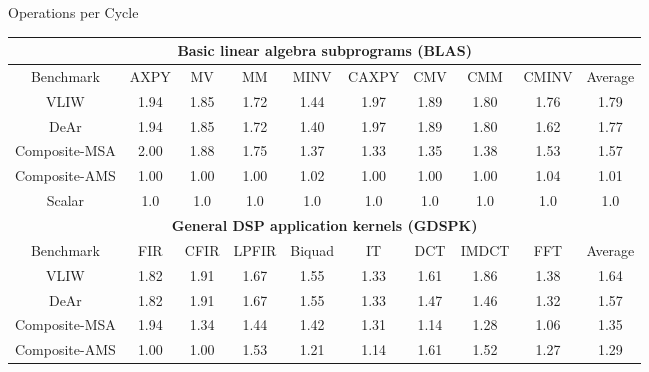 \documentclass{beamer}
\begin{document}
\begin{CJK}{UTF8}{bkai}
            \begin{frame}{Operations per Cycle}
                \begin{table}[!ht]
                    \centering
                    \resizebox{\columnwidth}{!}
                    {
                        \begin{tabular}{|c|c|c|c|c|c|c|c|c|c|}
                            \hline
                            \multicolumn{10}{|c|}{\textbf{Basic linear algebra subprograms (BLAS)}} \\ \hline
                            Benchmark  &  AXPY  &  MV  &  MM  &  MINV  &  CAXPY  &  CMV  &  CMM  &  CMINV  &  Average \\ \hline 
                            VLIW  &   1.94  &   1.85  &   1.72  &   1.44  &   1.97  &   1.89  &   1.80  &   1.76  &   1.79     \\ \hline 
                            DeAr  &   1.94  &   1.85  &   1.72  &   1.40  &   1.97  &   1.89  &   1.80  &   1.62  &   1.77     \\ \hline
                            Composite-MSA  &   2.00  &   1.88  &   1.75  &   1.37  &   1.33  &   1.35  &   1.38  &   1.53  &   1.57     \\ \hline 
                            Composite-AMS  &   1.00  &   1.00  &   1.00  &   1.02  &   1.00  &   1.00  &   1.00  &   1.04  &   1.01     \\ \hline 
                            Scalar  & 1.0  & 1.0  & 1.0  & 1.0  & 1.0  & 1.0  & 1.0  & 1.0  & 1.0 \\ \hline 
                            \multicolumn{10}{|c|}{\textbf{General DSP application kernels (GDSPK)}}                     \\ \hline
                            Benchmark  &  FIR  &  CFIR  &  LPFIR  &  Biquad  &  IT  &  DCT  &  IMDCT  &  FFT  &  Average \\ \hline 
                            VLIW  &   1.82  &   1.91  &   1.67  &   1.55  &   1.33  &   1.61  &   1.86  &   1.38  &   1.64     \\ \hline 
                            DeAr  &   1.82  &   1.91  &   1.67  &   1.55  &   1.33  &   1.47  &   1.46  &   1.32  &   1.57     \\ \hline 
                            Composite-MSA  &   1.94  &   1.34  &   1.44  &   1.42  &   1.31  &   1.14  &   1.28  &   1.06  &   1.35     \\ \hline 
                            Composite-AMS  &   1.00  &   1.00  &   1.53  &   1.21  &   1.14  &   1.61  &   1.52  &   1.27  &   1.29     \\ \hline 

\end{tabular}}
\end{table}
\end{frame}
\end{CJK}
\end{document}
